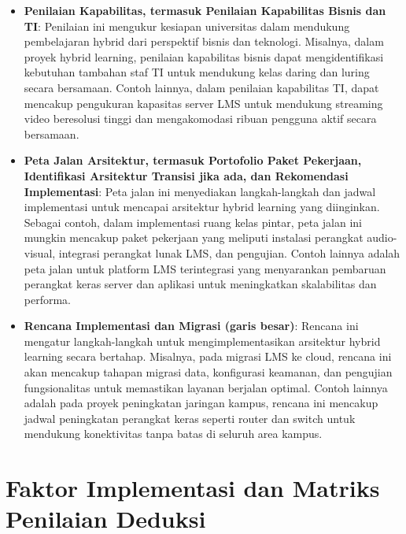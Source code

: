 \begin{itemize}
	\item \textbf{Penilaian Kapabilitas, termasuk Penilaian Kapabilitas Bisnis dan TI}: Penilaian ini mengukur kesiapan universitas dalam mendukung pembelajaran hybrid dari perspektif bisnis dan teknologi. Misalnya, dalam proyek hybrid learning, penilaian kapabilitas bisnis dapat mengidentifikasi kebutuhan tambahan staf TI untuk mendukung kelas daring dan luring secara bersamaan. Contoh lainnya, dalam penilaian kapabilitas TI, dapat mencakup pengukuran kapasitas server LMS untuk mendukung streaming video beresolusi tinggi dan mengakomodasi ribuan pengguna aktif secara bersamaan.
	
	\item \textbf{Peta Jalan Arsitektur, termasuk Portofolio Paket Pekerjaan, Identifikasi Arsitektur Transisi jika ada, dan Rekomendasi Implementasi}: Peta jalan ini menyediakan langkah-langkah dan jadwal implementasi untuk mencapai arsitektur hybrid learning yang diinginkan. Sebagai contoh, dalam implementasi ruang kelas pintar, peta jalan ini mungkin mencakup paket pekerjaan yang meliputi instalasi perangkat audio-visual, integrasi perangkat lunak LMS, dan pengujian. Contoh lainnya adalah peta jalan untuk platform LMS terintegrasi yang menyarankan pembaruan perangkat keras server dan aplikasi untuk meningkatkan skalabilitas dan performa.
	
	\item \textbf{Rencana Implementasi dan Migrasi (garis besar)}: Rencana ini mengatur langkah-langkah untuk mengimplementasikan arsitektur hybrid learning secara bertahap. Misalnya, pada migrasi LMS ke cloud, rencana ini akan mencakup tahapan migrasi data, konfigurasi keamanan, dan pengujian fungsionalitas untuk memastikan layanan berjalan optimal. Contoh lainnya adalah pada proyek peningkatan jaringan kampus, rencana ini mencakup jadwal peningkatan perangkat keras seperti router dan switch untuk mendukung konektivitas tanpa batas di seluruh area kampus.
\end{itemize}


\section{Faktor Implementasi dan Matriks Penilaian Deduksi}

